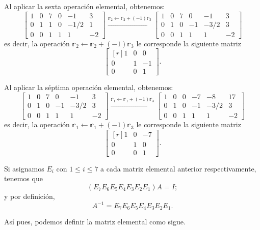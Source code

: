 Al aplicar la sexta operación elemental, obtenemos:
$$\left[ \begin{array}{rrr|rrr}
    1 & 0 & 7 & 0 & -1 & 3 \\
    0 & 1 & 1 & 0 & -1/2 & 1 \\
    0 & 0 & 1 & 1 & 1 & -2
\end{array} \right] \xrightarrow{\mathbb{r}_2 \leftarrow \mathbb{r}_2 + (-1) \mathbb{r}_3} \left[ \begin{array}{rrr|rrr}
    1 & 0 & 7 & 0 & -1 & 3 \\
    0 & 1 & 0 & -1 & -3/2 & 3 \\
    0 & 0 & 1 & 1 & 1 & -2
\end{array} \right]$$
es decir, la operación $\mathbb{r}_2 \leftarrow \mathbb{r}_2 + (-1) \mathbb{r}_3$ le corresponde la siguiente matriz
$$\begin{bmatrix*}[r]
    1 & 0 & 0 \\
    0 & 1 & -1 \\
    0 & 0 & 1
\end{bmatrix*}.$$

Al aplicar la séptima operación elemental, obtenemos:
$$\left[ \begin{array}{rrr|rrr}
    1 & 0 & 7 & 0 & -1 & 3 \\
    0 & 1 & 0 & -1 & -3/2 & 3 \\
    0 & 0 & 1 & 1 & 1 & -2
\end{array} \right] \xrightarrow{\mathbb{r}_1 \leftarrow \mathbb{r}_1 + (-1) \mathbb{r}_3} \left[ \begin{array}{rrr|rrr}
    1 & 0 & 0 & -7 & -8 & 17 \\
    0 & 1 & 0 & -1 & -3/2 & 3 \\
    0 & 0 & 1 & 1 & 1 & -2
\end{array} \right]$$
es decir, la operación $\mathbb{r}_1 \leftarrow \mathbb{r}_1 + (-1) \mathbb{r}_3$ le corresponde la siguiente matriz
$$\begin{bmatrix*}[r]
    1 & 0 & -7 \\
    0 & 1 & 0 \\
    0 & 0 & 1
\end{bmatrix*}.$$

Si asignamos $E_i$ con $1 \leq i \leq 7$ a cada matriz elemental anterior respectivamente, tenemos que
$$(E_7E_6E_5E_4E_3E_2E_1)A = I;$$
y por definición,
$$A^{-1} = E_7E_6E_5E_4E_3E_2E_1.$$

Así pues, podemos definir la matriz elemental como sigue.

